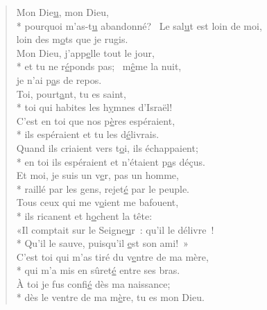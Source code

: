 
\begin{verse}
Mon Die\underline{u}, mon Dieu, \\*
pourquoi m’as-t\underline{u} abandonné?~\psalmstar
Le sal\underline{u}t est loin de moi, \\
loin des m\underline{o}ts que je rugis. \\

Mon Dieu, j’app\underline{e}lle tout le jour, \\*
et tu ne r\underline{é}ponds pas;~\psalmstar
m\underline{ê}me la nuit, \\
je n’ai p\underline{a}s de repos. \\

Toi, pourt\underline{a}nt, tu es saint, \\*
toi qui habites les h\underline{y}mnes d’Israël! \\
C’est en toi que nos p\underline{è}res espéraient, \\*
ils espéraient et tu les d\underline{é}livrais. \\
Quand ils criaient vers t\underline{o}i, ils échappaient; \\*
en toi ils espéraient et n’étaient p\underline{a}s déçus. \\

Et moi, je suis un v\underline{e}r, pas un homme, \\*
raillé par les gens, rejet\underline{é} par le peuple. \\
Tous ceux qui me v\underline{o}ient me bafouent, \\*
ils ricanent et h\underline{o}chent la tête: \\
«Il comptait sur le Seigne\underline{u}r : qu’il le délivre ! \\*
Qu’il le sauve, puisqu’il \underline{e}st son ami! » \\

C’est toi qui m’as tiré du v\underline{e}ntre de ma mère, \\*
qui m’a mis en sûret\underline{é} entre ses bras. \\
À toi je fus confi\underline{é} dès ma naissance; \\*
dès le ventre de ma m\underline{è}re, tu es mon Dieu. \\


\end{verse}
